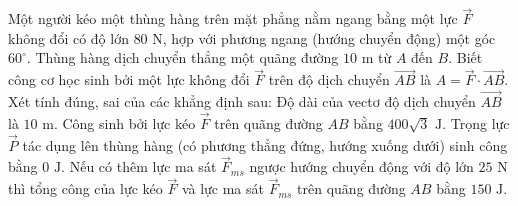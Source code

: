 \begin{ex}%
	Một người kéo một thùng hàng trên mặt phẳng nằm ngang bằng một lực $\overrightarrow{F}$ không đổi có độ lớn $80\text{ N}$, hợp với phương ngang (hướng chuyển động) một góc $60^\circ$. Thùng hàng dịch chuyển thẳng một quãng đường $10\text{ m}$ từ $A$ đến $B$. Biết công cơ học sinh bởi một lực không đổi $\overrightarrow{F}$ trên độ dịch chuyển $\overrightarrow{AB}$ là $A=\overrightarrow{F}\cdot\overrightarrow{AB}$. Xét tính đúng, sai của các khẳng định sau:
	\choiceTF
	{\True Độ dài của vectơ độ dịch chuyển $\overrightarrow{AB}$ là $10\text{ m}$.}
	{Công sinh bởi lực kéo $\overrightarrow{F}$ trên quãng đường $AB$ bằng $400\sqrt{3}\text{ J}$.}
	{\True Trọng lực $\overrightarrow{P}$ tác dụng lên thùng hàng (có phương thẳng đứng, hướng xuống dưới) sinh công bằng $0\text{ J}$.}
	{\True Nếu có thêm lực ma sát $\overrightarrow{F}_{ms}$ ngược hướng chuyển động với độ lớn $25\text{ N}$ thì tổng công của lực kéo $\overrightarrow{F}$ và lực ma sát $\overrightarrow{F}_{ms}$ trên quãng đường $AB$ bằng $150\text{ J}$.}
\end{ex}

